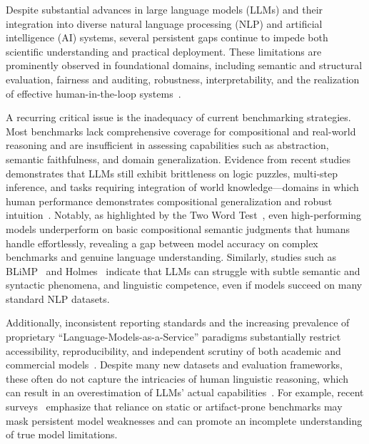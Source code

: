 \documentclass[sigconf]{acmart}
\begin{document}
Despite substantial advances in large language models (LLMs) and their integration into diverse natural language processing (NLP) and artificial intelligence (AI) systems, several persistent gaps continue to impede both scientific understanding and practical deployment. These limitations are prominently observed in foundational domains, including semantic and structural evaluation, fairness and auditing, robustness, interpretability, and the realization of effective human-in-the-loop systems~\cite{ref2,ref7,ref10,ref12,ref13,ref15,ref16,ref17,ref18,ref19,ref20,ref22,ref24,ref25,ref26,ref28,ref30,ref31,ref32,ref33,ref34,ref36,ref37,ref38,ref39,ref42,ref43,ref44,ref46,ref47,ref48,ref49,ref50,ref52,ref53,ref54,ref55,ref56,ref57,ref58,ref59,ref60,ref66,ref67,ref68,ref69,ref70,ref76,ref77,ref78,ref79,ref80,ref86,ref87,ref88,ref89,ref90,ref91,ref92,ref93,ref94,ref95,ref96,ref97,ref98,ref99,ref100,ref101,ref102,ref103,ref104,ref105,ref106,ref107,ref108}.

A recurring critical issue is the inadequacy of current benchmarking strategies. Most benchmarks lack comprehensive coverage for compositional and real-world reasoning and are insufficient in assessing capabilities such as abstraction, semantic faithfulness, and domain generalization. Evidence from recent studies demonstrates that LLMs still exhibit brittleness on logic puzzles, multi-step inference, and tasks requiring integration of world knowledge---domains in which human performance demonstrates compositional generalization and robust intuition~\cite{ref10,ref17,ref18,ref19,ref31,ref32,ref34,ref44,ref79,ref98,ref96,ref99,ref92}. Notably, as highlighted by the Two Word Test~\cite{ref96}, even high-performing models underperform on basic compositional semantic judgments that humans handle effortlessly, revealing a gap between model accuracy on complex benchmarks and genuine language understanding. Similarly, studies such as BLiMP~\cite{ref99} and Holmes~\cite{ref97} indicate that LLMs can struggle with subtle semantic and syntactic phenomena, and linguistic competence, even if models succeed on many standard NLP datasets. 

Additionally, inconsistent reporting standards and the increasing prevalence of proprietary ``Language-Models-as-a-Service'' paradigms substantially restrict accessibility, reproducibility, and independent scrutiny of both academic and commercial models~\cite{ref7,ref13,ref34,ref47,ref52,ref106,ref107,ref108}. Despite many new datasets and evaluation frameworks, these often do not capture the intricacies of human linguistic reasoning, which can result in an overestimation of LLMs' actual capabilities~\cite{ref44,ref77,ref79,ref98,ref99,ref102,ref103}. For example, recent surveys~\cite{ref10,ref55,ref56,ref44} emphasize that reliance on static or artifact-prone benchmarks may mask persistent model weaknesses and can promote an incomplete understanding of true model limitations.
\end{document}
